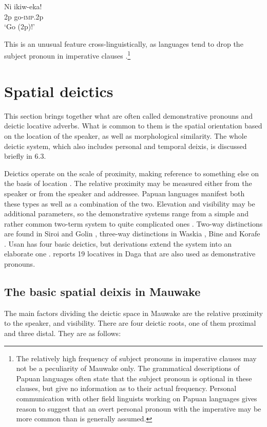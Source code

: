 \ea%
\label{ex:3:x685}
\gll Ni ikiw-eka! \\
2p go-\textsc{imp}.2p\\
\glt`Go (2p)!'
\z

This is an unusual feature cross-linguistically, as languages tend to drop the subject pronoun in imperative clauses \citep[80]{Givon1979}.\footnote{The relatively high frequency of subject pronouns in imperative clauses may not be a peculiarity of Mauwake only. The grammatical descriptions of Papuan languages often state that the subject pronoun is optional in these clauses, but give no information as to their actual frequency. Personal communication with other field linguists working on Papuan languages gives reason to suggest that an overt personal pronoun with the imperative may be more common than is generally assumed.} 

\section{Spatial deictics}\label{sec:3:6}
{}
This section brings together what are often called demonstrative pronouns and deictic locative adverbs. What is common to them is the spatial orientation based on the location of the speaker, as well as morphological similarity. The whole deictic system, which also includes personal and temporal deixis, is discussed briefly in 6.3. 

Deictics operate on the scale of proximity, making reference to something else on the basis of location \citep[57--58]{HallidayEtAl1976}. The relative proximity may be measured either from the speaker or from the speaker and addressee. Papuan languages manifest both these types as well as a combination of the two. Elevation and visibility may be additional parameters, so the demonstrative systems range from a simple and rather common two-term system to quite complicated ones \citep[75--77]{Foley1986}. Two-way distinctions are found in Siroi \citep[20]{Wells1979} and Golin \citep{Bunn1974}, three-way distinctions in Waskia \citep[59]{RossEtAl1978}%
, Bine \citep{Saari1985} and Korafe \citep[65]{FarrEtAl1982}%
. Usan has four basic deictics, but derivations extend the system into an elaborate one \citep[76--81]{Reesink1987}. \citet[38--39]{Murane1974} reports 19 locatives in Daga that are also used as demonstrative pronouns. 

\subsection{The basic spatial deixis in Mauwake}
{}
The main factors dividing the deictic space in Mauwake are the relative proximity to the speaker, and visibility. There are four deictic roots, one of them proximal and three distal. They are as follows: 

